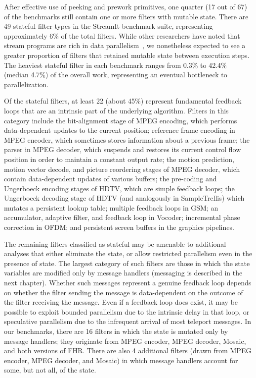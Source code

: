   After effective use
of peeking and prework primitives, one quarter (17 out of 67) of the
benchmarks still contain one or more filters with mutable state.
There are 49 stateful filter types in the StreamIt benchmark suite,
representing approximately 6\% of the total filters.  While other
researchers have noted that stream programs are rich in data
parallelism~\cite{imagine03ieee}, we nonetheless expected to see a
greater proportion of filters that retained mutable state between
execution steps.  The heaviest stateful filter in each benchmark
ranges from 0.3\% to 42.4\% (median 4.7\%) of the overall work,
representing an eventual bottleneck to parallelization.

Of the stateful filters, at least 22 (about 45\%) represent
fundamental feedback loops that are an intrinsic part of the
underlying algorithm.  Filters in this category include the
bit-alignment stage of MPEG encoding, which performs data-dependent
updates to the current position; reference frame encoding in MPEG
encoder, which sometimes stores information about a previous frame;
the parser in MPEG decoder, which suspends and restores its current
control flow position in order to maintain a constant output rate; the
motion prediction, motion vector decode, and picture reordering stages
of MPEG decoder, which contain data-dependent updates of various
buffers; the pre-coding and Ungerboeck encoding stages of HDTV, which
are simple feedback loops; the Ungerboeck decoding stage of HDTV (and
analogously in SampleTrellis) which mutates a persistent lookup table;
multiple feedback loops in GSM; an accumulator, adaptive filter, and
feedback loop in Vocoder; incremental phase correction in OFDM; and
persistent screen buffers in the graphics pipelines.

The remaining filters classified as stateful may be amenable to
additional analyses that either eliminate the state, or allow
restricted parallelism even in the presence of state.  The largest
category of such filters are those in which the state variables are
modified only by message handlers (messaging is described in the next
chapter).  Whether such messages represent a genuine feedback loop
depends on whether the filter sending the message is data-dependent on
the outcome of the filter receiving the message.  Even if a feedback
loop does exist, it may be possible to exploit bounded parallelism due
to the intrinsic delay in that loop, or speculative parallelism due to
the infrequent arrival of most teleport messages.  In our benchmarks,
there are 16 filters in which the state is mutated only by message
handlers; they originate from MPEG encoder, MPEG decoder, Mosaic, and
both versions of FHR.  There are also 4 additional filters (drawn from
MPEG encoder, MPEG decoder, and Mosaic) in which message handlers
account for some, but not all, of the state.

